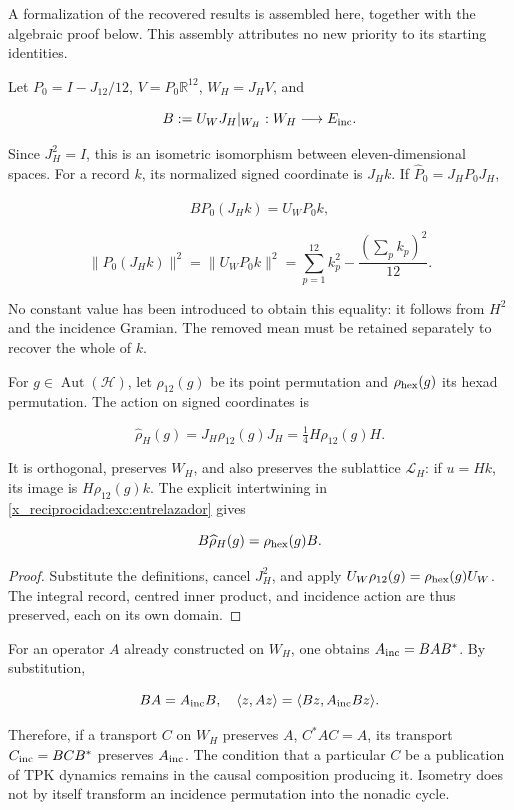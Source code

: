A formalization of the recovered results is assembled here, together with the algebraic proof below. This assembly attributes no new priority to its starting identities.

Let \(P_0=I-J_{12}/12\), \(V=P_0\mathbb R^{12}\), \(W_H=J_HV\), and

\[
B:=U_WJ_H|_{W_H}:W_H\longrightarrow E_{\rm inc}.
\]

Since \(J_H^2=I\), this is an isometric isomorphism between eleven-dimensional spaces. For a record \(k\), its normalized signed coordinate is \(J_Hk\). If \(\widehat P_0=J_HP_0J_H\),

\[
B\widehat P_0(J_Hk)=U_WP_0k,
\]

\[
\|\widehat P_0(J_Hk)\|^2
=\|U_WP_0k\|^2
=\sum_{p=1}^{12}k_p^2-\frac{(\sum_pk_p)^2}{12}.
\]

No constant value has been introduced to obtain this equality: it follows from \(H^2\) and the incidence Gramian. The removed mean must be retained separately to recover the whole of \(k\).

For \(g\in\operatorname{Aut}(\mathcal H)\), let \(\rho_{12}(g)\) be its point permutation and \(\rho_{\rm hex}(g)\) its hexad permutation. The action on signed coordinates is

\[
\widehat\rho_H(g)=J_H\rho_{12}(g)J_H
=\tfrac14H\rho_{12}(g)H.
\]

It is orthogonal, preserves \(W_H\), and also preserves the sublattice \(\mathcal L_H\): if \(u=Hk\), its image is \(H\rho_{12}(g)k\). The explicit intertwining in \cref{x_reciprocidad:exc:entrelazador} gives

\[
B\widehat\rho_H(g)=\rho_{\rm hex}(g)B.
\]

\begin{proof}
Substitute the definitions, cancel \(J_H^2\), and apply \(U_W\rho_{12}(g)=\rho_{\rm hex}(g)U_W\). The integral record, centred inner product, and incidence action are thus preserved, each on its own domain.
\end{proof}

For an operator \(A\) already constructed on \(W_H\), one obtains \(A_{\rm inc}=BAB^*\). By substitution,

\[
BA=A_{\rm inc}B,\quad
\langle z,Az\rangle=\langle Bz,A_{\rm inc}Bz\rangle.
\]

Therefore, if a transport \(C\) on \(W_H\) preserves \(A\), \(C^*AC=A\), its transport \(C_{\rm inc}=BCB^*\) preserves \(A_{\rm inc}\). The condition that a particular \(C\) be a publication of TPK dynamics remains in the causal composition producing it. Isometry does not by itself transform an incidence permutation into the nonadic cycle.

